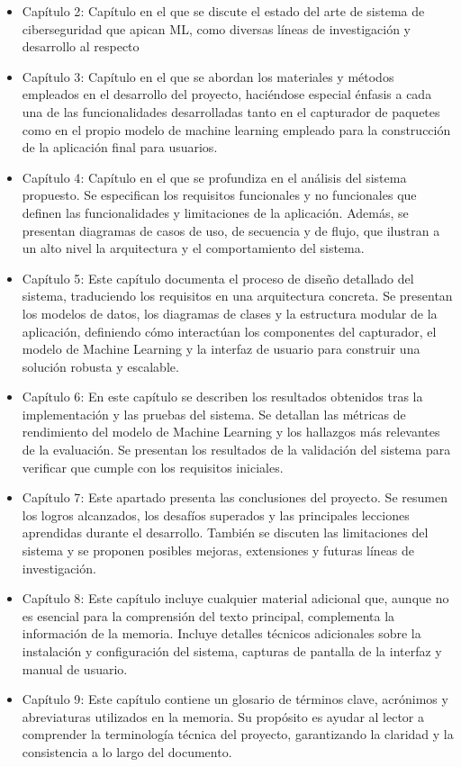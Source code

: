 \begin{itemize}
    \item{Capítulo 2}: Capítulo en el que se discute el estado del arte de sistema de ciberseguridad que apican ML, como diversas líneas de investigación y desarrollo al respecto
    \item{Capítulo 3}: Capítulo en el que se abordan los materiales y métodos empleados en el desarrollo del proyecto, haciéndose especial énfasis a cada una de las funcionalidades desarrolladas tanto en el capturador de paquetes como en el propio modelo de machine learning empleado para la construcción de la aplicación final para usuarios.
    \item{Capítulo 4}: Capítulo en el que se profundiza en el análisis del sistema propuesto. Se especifican los requisitos funcionales y no funcionales que definen las funcionalidades y limitaciones de la aplicación. Además, se presentan diagramas de casos de uso, de secuencia y de flujo, que ilustran a un alto nivel la arquitectura y el comportamiento del sistema.
    \item{Capítulo 5}: Este capítulo documenta el proceso de diseño detallado del sistema, traduciendo los requisitos en una arquitectura concreta. Se presentan los modelos de datos, los diagramas de clases y la estructura modular de la aplicación, definiendo cómo interactúan los componentes del capturador, el modelo de Machine Learning y la interfaz de usuario para construir una solución robusta y escalable.
    \item{Capítulo 6}: En este capítulo se describen los resultados obtenidos tras la implementación y las pruebas del sistema. Se detallan las métricas de rendimiento del modelo de Machine Learning y los hallazgos más relevantes de la evaluación. Se presentan los resultados de la validación del sistema para verificar que cumple con los requisitos iniciales.
    \item{Capítulo 7}: Este apartado presenta las conclusiones del proyecto. Se resumen los logros alcanzados, los desafíos superados y las principales lecciones aprendidas durante el desarrollo. También se discuten las limitaciones del sistema y se proponen posibles mejoras, extensiones y futuras líneas de investigación.
    \item{Capítulo 8}: Este capítulo incluye cualquier material adicional que, aunque no es esencial para la comprensión del texto principal, complementa la información de la memoria. Incluye detalles técnicos adicionales sobre la instalación y configuración del sistema, capturas de pantalla de la interfaz y manual de usuario.
    \item{Capítulo 9}: Este capítulo contiene un glosario de términos clave, acrónimos y abreviaturas utilizados en la memoria. Su propósito es ayudar al lector a comprender la terminología técnica del proyecto, garantizando la claridad y la consistencia a lo largo del documento.
    
\end{itemize}
